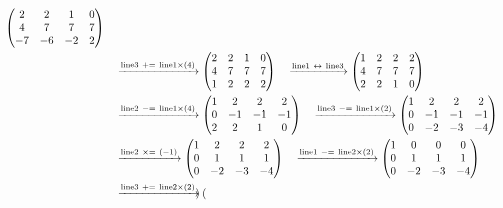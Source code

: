 \documentclass{ltjsarticle}
\begin{document}
\begin{align*}
 \begin{pmatrix}
 2 & 2 & 1 & 0\\
 4 & 7 & 7 & 7\\
 - 7 & - 6 & - 2 & 2
\end{pmatrix}\allowdisplaybreaks\\
&\ \ \ \xrightarrow{ \text{line} 3 \ +=\  \text{line} 1 \times\left( 4 \right)} %
\begin{pmatrix}
 2 & 2 & 1 & 0\\
 4 & 7 & 7 & 7\\
 1 & 2 & 2 & 2
\end{pmatrix}\ \ \ \xrightarrow{ \text{line} 1 \ \leftrightarrow\  \text{line} 3 } %
\begin{pmatrix}
 1 & 2 & 2 & 2\\
 4 & 7 & 7 & 7\\
 2 & 2 & 1 & 0
\end{pmatrix}\allowdisplaybreaks\\
 &\ \ \ \xrightarrow{ \text{line} 2 \ -=\  \text{line} 1 \times\left( 4 \right)} %
\begin{pmatrix}
 1 & 2 & 2 & 2\\
 0 & -1 & -1 & -1\\
 2 & 2 & 1 & 0
\end{pmatrix}\ \ \ \xrightarrow{ \text{line} 3 \ -=\  \text{line} 1 \times\left( 2 \right)} %
\begin{pmatrix}
 1 & 2 & 2 & 2\\
 0 & -1 & -1 & -1\\
 0 & - 2 & - 3 & - 4
\end{pmatrix}\allowdisplaybreaks\\
 &\ \ \ \xrightarrow{ \text{line} 2 \ \times=\ \left( - 1 \right)} %
\begin{pmatrix}
 1 & 2 & 2 & 2\\
 0 & 1 & 1 & 1\\
 0 & - 2 & - 3 & - 4
\end{pmatrix}\ \ \ \xrightarrow{ \text{line} 1 \ -=\  \text{line} 2 \times\left( 2 \right)} %
\begin{pmatrix}
 1 & 0 & 0 & 0\\
 0 & 1 & 1 & 1\\
 0 & - 2 & - 3 & - 4
\end{pmatrix}\allowdisplaybreaks\\
 &\ \ \ \xrightarrow{ \text{line} 3 \ +=\  \text{line} 2 \times\left( 2 \right)} %
\begin{pmatrix}

\end{pmatrix}
\end{align*}
\end{document}
